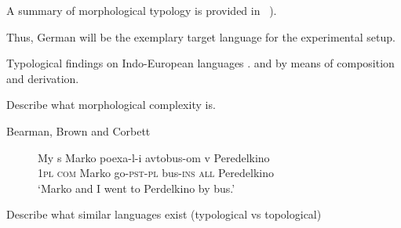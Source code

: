 A summary of morphological typology is provided in ~\cite*[78--93]{LINGUISTICTYPOLOGY}).


Thus, German will be the exemplary target language for the experimental setup.

Typological findings on Indo-European languages .
and by means of composition and derivation.





Describe what morphological complexity is.

Bearman, Brown and Corbett


\begin{figure}
    \label{fig:glossing}
    \begin{exe}
        \ex
        \gll  My s Marko poexa-l-i avtobus-om v Peredelkino \\
        1\textsc{pl} \textsc{com} Marko go-\textsc{pst}-\textsc{pl} bus-\textsc{ins} \textsc{all} Peredelkino \\
        \glt  `Marko and I went to Perdelkino by bus.'
    \end{exe}
\end{figure}



Describe what similar languages exist (typological vs topological)

